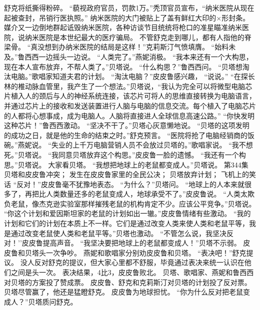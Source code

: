 \documentclass[a4paper,12pt,UTF8,twoside]{ctexbook}
\begin{document}
        舒克将纸撕得粉碎。  
        “藐视政府官员，罚款1万。”秃顶官员宣布，“纳米医院从现在起被查封，吊销行医执照。”  
        纳米医院的大门被贴上了盖有鲜红大印的×形封条。  
        媒介又一边倒地群起诋毁纳米医院，各种访谈节目统统将枪口的准星瞄准纳米医院，说纳米医院是本世纪最大的医疗骗局。  
        不管舒克走到哪儿，都有人指他的脊梁骨。  
        “真没想到办纳米医院的结局是这样！”克莉斯汀气愤填膺。  
        “始料未及。”鲁西西一边摇头一边说。  
        “人类完了。”燕妮消极。  
        “我本来还有一个大构思，现在本人宣布放弃，不帮人类了。”贝塔说。  
        “什么构思？”鲁西西问。  
        “贝塔想淘汰电脑。”歌唱家知道夫君的计划。  
        “淘汰电脑？”皮皮鲁感兴趣，  “说说。”  
        “在探长林的椎动脉血管里，我产生了一个想法。”贝塔说，“我认为完全可以将微型电脑芯片植入人的颈后与人的神经系统连接，该芯片可将人的思维直接转换为电脑语言，并通过芯片上的接收和发送装置进行人脑与电脑的信息交流。每个植入了电脑芯片的人都将心想事成，成为电脑人。人脑将直接进人全球信息高速公路。”  
        “你快发明这种芯片！”鲁西西激动。  
        “坚决不干了。”贝塔心灰意懒地说。  
        “贝塔的这项发明的成功之日，就是他的生命的结束之时。”舒克预言。  
        “医院将抢了电脑经销商的饭碗。”燕妮说。  
        “失业的上千万电脑营销人员不会放过贝塔的。”歌唱家说。  
        “我不想死。”贝塔说。  
        “我同意贝塔放弃这个构思。”皮皮鲁一脸的遗憾。  
        “我还有一个构思。”贝塔说。  
        大家看贝塔。  
        “我想把地球上的老鼠都变成人。”贝塔说。          第344集  
        贝塔和皮皮鲁冲突；  
        发生在皮皮鲁家里的全民公决；  
        贝塔放弃计划；  
        飞机上的笑话    
        “反对！”皮皮鲁毫不犹豫地表态。  
        “为什么？”贝塔问。  
        “地球上的人本来就很多了，再把比人类数量还多的老鼠变成人，地球承受不了。”皮皮鲁说。  
        “人类太欺负老鼠，像杰克逊实验室那样摧残老鼠的机构肯定不少。应该公平竞争。”贝塔说。  
        “你这个计划和爱因斯坦家的老鼠的计划如出一辙。”皮皮鲁情绪有些激动。  
        “我的计划和它们的计划在本质上不一样。它们是通过改变人类来使人类和老鼠平等，我是通过改变老鼠使人类和老鼠平等。”贝塔也激动。        
        “不管怎么说，我坚决反对！'’皮皮鲁提高声音。  
        “我坚决要把地球上的老鼠都变成人！”贝塔不示弱。  
        皮皮鲁和贝塔头一次争吵。  
        燕妮和歌唱家分别劝皮皮鲁和贝塔。  
        “表决吧！”舒克提议。  
        没人反对舒克的提议，但大家心里都不舒服，毕竟通过表决来统一认识在他们之间是头一次。  
        表决结果，4比3，皮皮鲁败北。  
        贝塔、歌唱家、燕妮和鲁西西对贝塔的方案投了赞成票。  
        皮皮鲁、舒克和克莉斯汀对贝塔的计划投了反对票。  
        贝塔尽管赢了，他还是猛瞪舒克。  
        皮皮鲁为地球担忧。  
        “你为什么反对把老鼠变成人？”贝塔质问舒克。  
\end{document}
